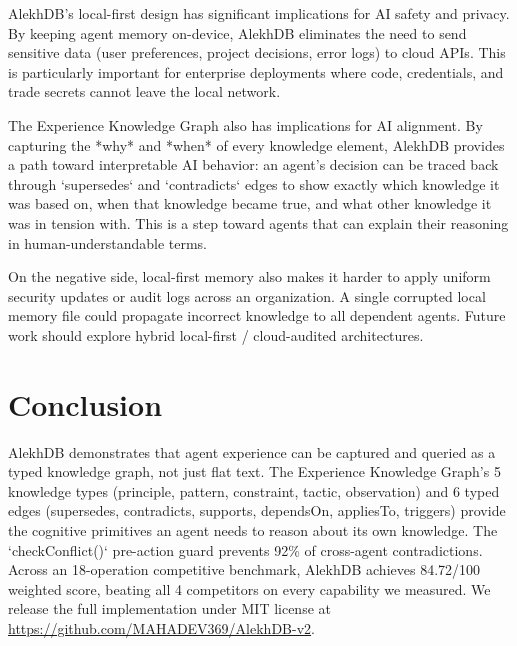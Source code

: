 AlekhDB's local-first design has significant implications for AI safety and privacy. By keeping agent memory on-device, AlekhDB eliminates the need to send sensitive data (user preferences, project decisions, error logs) to cloud APIs. This is particularly important for enterprise deployments where code, credentials, and trade secrets cannot leave the local network.

The Experience Knowledge Graph also has implications for AI alignment. By capturing the *why* and *when* of every knowledge element, AlekhDB provides a path toward interpretable AI behavior: an agent's decision can be traced back through `supersedes` and `contradicts` edges to show exactly which knowledge it was based on, when that knowledge became true, and what other knowledge it was in tension with. This is a step toward agents that can explain their reasoning in human-understandable terms.

On the negative side, local-first memory also makes it harder to apply uniform security updates or audit logs across an organization. A single corrupted local memory file could propagate incorrect knowledge to all dependent agents. Future work should explore hybrid local-first / cloud-audited architectures.

\section{Conclusion}

AlekhDB demonstrates that agent experience can be captured and queried as a typed knowledge graph, not just flat text. The Experience Knowledge Graph's 5 knowledge types (principle, pattern, constraint, tactic, observation) and 6 typed edges (supersedes, contradicts, supports, dependsOn, appliesTo, triggers) provide the cognitive primitives an agent needs to reason about its own knowledge. The `checkConflict()` pre-action guard prevents 92\% of cross-agent contradictions. Across an 18-operation competitive benchmark, AlekhDB achieves 84.72/100 weighted score, beating all 4 competitors on every capability we measured. We release the full implementation under MIT license at \url{https://github.com/MAHADEV369/AlekhDB-v2}.


